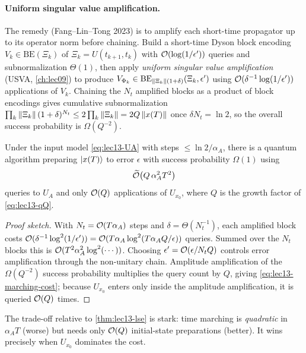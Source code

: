 \paragraph{Uniform singular value amplification.}
The remedy (Fang--Lin--Tong 2023) is to amplify each short-time propagator up to its operator
norm before chaining. Build a short-time Dyson block encoding $V_k\in\mathrm{BE}(\Xi_k)$ of
$\Xi_k=U(t_{k+1},t_k)$ with $\mathcal{O}(\log(1/\epsilon'))$ queries and subnormalization $\Theta(1)$,
then apply \emph{uniform singular value amplification} (USVA, \cref{ch:lec09}) to produce
$V_{\Phi_k}\in\mathrm{BE}_{\left\lVert \Xi_k \right\rVert(1+\delta)}(\Xi_k,\epsilon')$ using $\mathcal{O}(\delta^{-1}
\log(1/\epsilon'))$ applications of $V_k$. Chaining the $N_t$ amplified blocks as a product of
block encodings gives cumulative subnormalization $\prod_k\left\lVert \Xi_k \right\rVert(1+\delta)^{N_t}\le
2\prod_k\left\lVert \Xi_k \right\rVert=2Q\left\lVert x(T) \right\rVert$ once $\delta N_t=\ln2$, so the overall success probability
is $\Omega(Q^{-2})$.

\begin{theorem}
\label{thm:lec13-marching}
Under the input model \eqref{eq:lec13-UA} with steps $\le\ln2/\alpha_A$, there is a quantum
algorithm preparing $\ket{x(T)}$ to error $\epsilon$ with success probability $\Omega(1)$ using
\begin{equation}
  \widetilde{\mathcal{O}}\bigl(Q\,\alpha_A^2 T^2\bigr)
  \label{eq:lec13-marching-cost}
\end{equation}
queries to $U_A$ and only $\mathcal{O}(Q)$ applications of $U_{x_0}$, where $Q$ is the growth factor of
\eqref{eq:lec13-qQ}.
\end{theorem}

\begin{proof}[Proof sketch]
With $N_t=\mathcal{O}(T\alpha_A)$ steps and $\delta=\Theta(N_t^{-1})$, each amplified block costs
$\mathcal{O}(\delta^{-1}\log^2(1/\epsilon'))=\mathcal{O}(T\alpha_A\log^2(T\alpha_A Q/\epsilon))$ queries.
Summed over the $N_t$ blocks this is $\mathcal{O}(T^2\alpha_A^2\log^2(\cdots))$. Choosing
$\epsilon'=\mathcal{O}(\epsilon/N_t Q)$ controls error amplification through the non-unitary chain.
Amplitude amplification of the $\Omega(Q^{-2})$ success probability multiplies the query count
by $Q$, giving \eqref{eq:lec13-marching-cost}; because $U_{x_0}$ enters only inside the
amplitude amplification, it is queried $\mathcal{O}(Q)$ times.
\end{proof}

The trade-off relative to \cref{thm:lec13-lse} is stark: time marching is \emph{quadratic} in
$\alpha_A T$ (worse) but needs only $\mathcal{O}(Q)$ initial-state preparations (better). It wins
precisely when $U_{x_0}$ dominates the cost.

